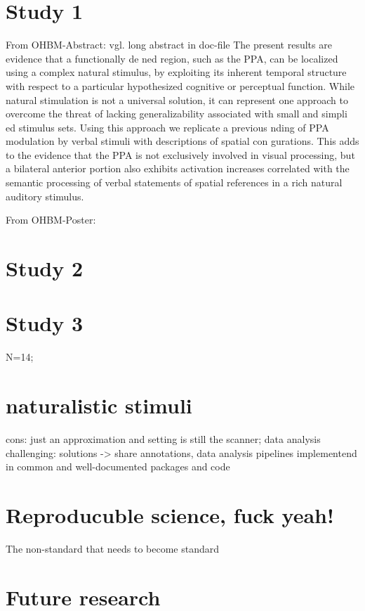 \section{Study 1}
%
From OHBM-Abstract: vgl. long abstract in doc-file
%
The present results are evidence that a functionally de ned region, such as the
PPA, can be localized using a complex natural stimulus, by exploiting its
inherent temporal structure with respect to a particular hypothesized cognitive
or perceptual function.
%
While natural stimulation is not a universal solution, it can represent one
approach to overcome the threat of lacking generalizability associated with
small and simpli ed stimulus sets.
%
Using this approach we replicate a previous nding of PPA modulation by verbal
stimuli with descriptions of spatial con gurations.
%
This adds to the evidence that the PPA is not exclusively involved in visual
processing, but a bilateral anterior portion also exhibits activation increases
correlated with the semantic processing of verbal statements of spatial
references in a rich natural auditory stimulus.

%
From OHBM-Poster:


\section{Study 2}



\section{Study 3}

N=14;


\section{naturalistic stimuli}

cons: just an approximation and setting is still the scanner; data analysis
challenging: solutions -> share annotations, data analysis pipelines
implementend in common and well-documented packages and code

\section{Reproducuble science, fuck yeah!}

The non-standard that needs to become standard


\section{Future research}

